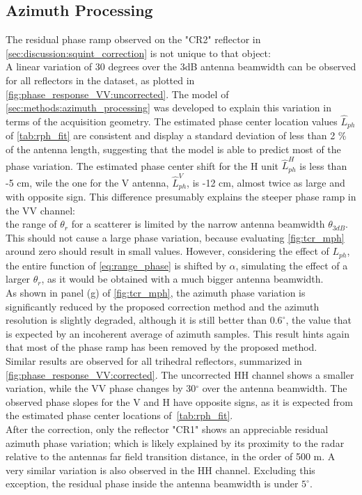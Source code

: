 \subsection{Azimuth Processing}\label{sec:discussion:azimuth_processing}
The residual phase ramp observed on the "CR2" reflector in \autoref{sec:discussion:squint_correction} is not unique to that object:\\ A linear variation of 30 degrees over the 3dB antenna beamwidth can be observed for all reflectors in the dataset, as plotted in \autoref{fig:phase_response_VV:uncorrected}.  The model of \autoref{sec:methods:azimuth_processing} was developed to explain this variation in terms of the acquisition geometry.
The estimated phase center location values $\hat{L}_{ph}$ of \autoref{tab:rph_fit} are consistent and display a standard deviation of less than 2 \% of the antenna length, suggesting that the model is able to predict most of the phase variation. The estimated phase center shift for the H unit $\hat{L}_{ph}^{H}$ is less than -5 cm, wile the one for the V antenna, $\hat{L}_{ph}^{V}$, is -12 cm, almost twice as large and with opposite sign. This difference presumably explains the steeper phase ramp in the VV channel:\\
the range of $\theta_r$ for a scatterer is limited by the narrow antenna beamwidth $\theta_{3dB}$. This should not cause a large phase variation, because evaluating \eqref{fig:tcr_mph} around zero should result in small values. However, considering the effect of $L_{ph}$, the entire function of \autoref{eq:range_phase} is shifted  by $\alpha$, simulating the effect of a larger $\theta_r$, as it would be obtained with a much bigger antenna beamwidth.\\
As shown in panel (g) of \autoref{fig:tcr_mph}, the azimuth phase variation is significantly reduced by the proposed correction method and the azimuth resolution is slightly degraded, although it is still better than $0.6^\circ$, the value that is expected by an incoherent average of azimuth samples. This result hints again that most of the phase ramp has been removed by the proposed method.\\
Similar results are observed for all trihedral reflectors, summarized in \autoref{fig:phase_response_VV:corrected}. The uncorrected HH channel shows a smaller variation, while the VV phase changes by 30$^\circ$ over the antenna beamwidth. The observed phase slopes for the V and H have opposite signs, as it is expected from the estimated phase center locations of~\autoref{tab:rph_fit}.\\  After the correction, only the reflector "CR1" shows an appreciable residual azimuth phase variation; which is likely explained by its proximity to the radar relative to the antennas far field transition distance, in the order of 500 m. A very similar variation is also observed in the HH channel. Excluding this exception, the residual phase inside the antenna beamwidth is under $5^\circ$.

